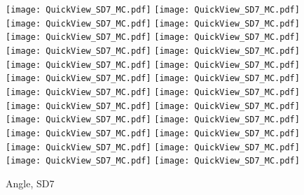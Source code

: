 \documentclass[amsmath,amssymb,aps,floatfix]{revtex4-1}
\begin{document}
\begin{figure}
   \centering
   \texttt{[image: QuickView\_SD7\_MC.pdf]}
   \texttt{[image: QuickView\_SD7\_MC.pdf]}
   \texttt{[image: QuickView\_SD7\_MC.pdf]}
   \texttt{[image: QuickView\_SD7\_MC.pdf]}\\
   \texttt{[image: QuickView\_SD7\_MC.pdf]}
   \texttt{[image: QuickView\_SD7\_MC.pdf]}
   \texttt{[image: QuickView\_SD7\_MC.pdf]}
   \texttt{[image: QuickView\_SD7\_MC.pdf]}\\
   \texttt{[image: QuickView\_SD7\_MC.pdf]}
   \texttt{[image: QuickView\_SD7\_MC.pdf]}
   \texttt{[image: QuickView\_SD7\_MC.pdf]}
   \texttt{[image: QuickView\_SD7\_MC.pdf]}\\
   \texttt{[image: QuickView\_SD7\_MC.pdf]}
   \texttt{[image: QuickView\_SD7\_MC.pdf]}
   \texttt{[image: QuickView\_SD7\_MC.pdf]}
   \texttt{[image: QuickView\_SD7\_MC.pdf]}\\
   \texttt{[image: QuickView\_SD7\_MC.pdf]}
   \texttt{[image: QuickView\_SD7\_MC.pdf]}
   \texttt{[image: QuickView\_SD7\_MC.pdf]}
   \texttt{[image: QuickView\_SD7\_MC.pdf]}\\
   \texttt{[image: QuickView\_SD7\_MC.pdf]}
   \texttt{[image: QuickView\_SD7\_MC.pdf]}
   \texttt{[image: QuickView\_SD7\_MC.pdf]}
   \texttt{[image: QuickView\_SD7\_MC.pdf]}\\
   \caption{Angle, SD7}
   \label{Figure:SD7Result}
\end{figure}
\end{document}
